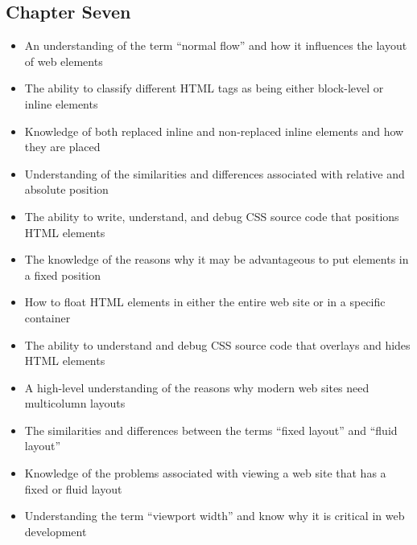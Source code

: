 \documentclass[11pt]{article}
\begin{document}
\vspace*{-.2in}
\subsection*{Chapter Seven}

\begin{itemize}

  \itemsep 0.05in

  \item An understanding of the term ``normal flow'' and how it influences the
    layout of web elements

  \item The ability to classify different HTML tags as being either block-level
    or inline elements

  \item Knowledge of both replaced inline and non-replaced inline elements and
    how they are placed

  \item Understanding of the similarities and differences associated with
    relative and absolute position

  \item The ability to write, understand, and debug CSS source code that
    positions HTML elements

  \item The knowledge of the reasons why it may be advantageous to put elements
    in a fixed position

  \item How to float HTML elements in either the entire web site or in a
    specific container

  \item The ability to understand and debug CSS source code that overlays and
    hides HTML elements

  \item A high-level understanding of the reasons why modern web sites need
    multicolumn layouts

  \item The similarities and differences between the terms ``fixed layout'' and
    ``fluid layout''

  \item Knowledge of the problems associated with viewing a web site that has a
    fixed or fluid layout

  \item Understanding the term ``viewport width'' and know why it is critical in
    web development


\end{itemize}
\end{document}
